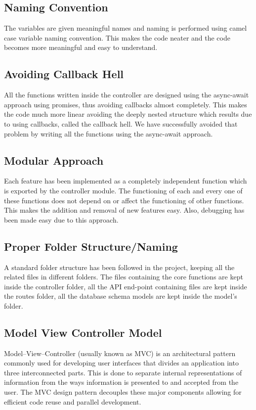 \subsection{Naming Convention}
The variables are given meaningful names and naming is performed using camel case variable naming convention. This makes the code neater and the code becomes more meaningful and easy to understand.

\subsection{Avoiding Callback Hell}
All the functions written inside the controller are designed using the async-await approach using promises, thus avoiding callbacks almost completely. This makes the code much more linear avoiding the deeply nested structure which results due to using callbacks, called the callback hell. We have successfully avoided that problem by writing all the functions using the async-await approach.

\subsection{Modular Approach}
Each feature has been implemented as a completely independent function which is exported by the controller module. The functioning of each and every one of these functions does not depend on or affect the functioning of other functions. This makes the addition and removal of new features easy. Also, debugging has been made easy due to this approach.

\subsection{Proper Folder Structure/Naming}
A standard folder structure has been followed in the project, keeping all the related files in different folders. The files containing the core functions are kept inside the controller folder, all the API end-point containing files are kept inside the routes folder, all the database schema models are kept inside the model's folder.

\subsection{Model View Controller Model}
Model–View–Controller (usually known as MVC) is an architectural pattern commonly used for developing user interfaces that divides an application into three interconnected parts. This is done to separate internal representations of information from the ways information is presented to and accepted from the user. The MVC design pattern decouples these major components allowing for efficient code reuse and parallel development.

